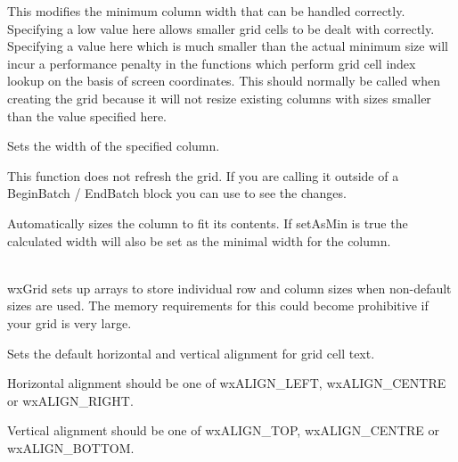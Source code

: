 \label{wxgridsetcolminimalacceptablewidth}


This modifies the minimum column width that can be handled correctly. Specifying a low value here
allows smaller grid cells to be dealt with correctly. Specifying a value here which is much smaller
than the actual minimum size will incur a performance penalty in the functions which perform
grid cell index lookup on the basis of screen coordinates.
This should normally be called when creating the grid because it will not resize existing columns
with sizes smaller than the value specified here.



\label{wxgridsetcolsize}


Sets the width of the specified column.

This function does not refresh the grid. If you are calling it outside of a BeginBatch / EndBatch
block you can use  to see the changes.

Automatically sizes the column to fit its contents. If setAsMin is true the calculated width will
also be set as the minimal width for the column.

\\
wxGrid sets up arrays to store individual row and column sizes when non-default sizes are used.
The memory requirements for this could become prohibitive if your grid is very large.



\label{wxgridsetdefaultcellalignment}


Sets the default horizontal and vertical alignment for grid cell text.

Horizontal alignment should be one of wxALIGN\_LEFT, wxALIGN\_CENTRE or wxALIGN\_RIGHT.

Vertical alignment should be one of wxALIGN\_TOP, wxALIGN\_CENTRE or wxALIGN\_BOTTOM.



\label{wxgridsetdefaultcellbackgroundcolour}

